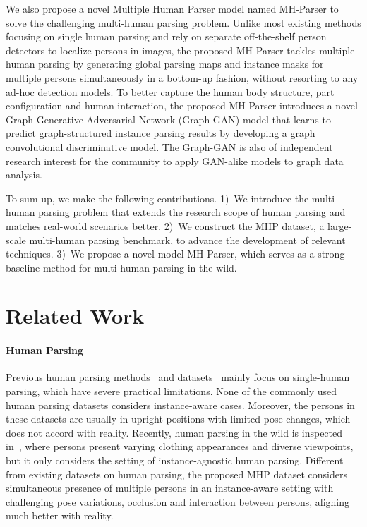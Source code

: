 \documentclass[10pt, letterpaper]{article}
\begin{document}
We also propose a novel  Multiple Human Parser model named MH-Parser to solve the challenging multi-human parsing problem. Unlike most existing methods focusing on single human parsing and rely on separate off-the-shelf person detectors to localize persons in images, the proposed MH-Parser tackles multiple human parsing by generating global parsing maps and instance masks for multiple persons  simultaneously in a bottom-up fashion, without resorting to any ad-hoc detection models. To better capture the human body structure, part configuration and human interaction,  the proposed MH-Parser introduces a novel Graph Generative Adversarial Network (Graph-GAN) model that learns to predict graph-structured instance parsing results by developing a graph convolutional discriminative model. The Graph-GAN is also of independent research interest for the community to apply GAN-alike models to graph data analysis.

To sum up, we make the following contributions. 1)~We introduce the multi-human parsing problem that extends the research scope of human parsing and matches real-world scenarios better. 2)~We construct the MHP dataset, a large-scale multi-human parsing benchmark, to advance the development of relevant techniques. 3)~We propose a novel model MH-Parser, which serves as a strong baseline method for multi-human parsing in the wild. 

\section{Related Work}

\paragraph{Human Parsing}
Previous human parsing methods~\cite{liu2015matching,liang2015human,liang2016semantic} and datasets~\cite{yamaguchi2012parsing,chen2014detect,liang2015human,liang2015deep} mainly focus on single-human parsing, which have severe practical limitations. None of the commonly used human parsing datasets considers instance-aware cases. Moreover, the persons in these datasets are usually in upright positions with limited pose changes, which does not accord with reality. Recently, human parsing in the wild is inspected in~\cite{gong2017look}, where persons present varying clothing appearances and diverse viewpoints, but it only considers the setting of instance-agnostic human parsing. Different from existing datasets on human parsing, the proposed MHP dataset considers simultaneous presence of multiple persons in an instance-aware setting with challenging pose variations, occlusion and interaction between persons, aligning much better with reality.
\end{document}
